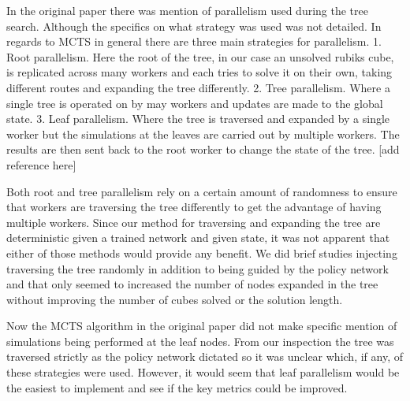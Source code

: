 \documentclass[10pt,twocolumn,letterpaper]{article}
\begin{document}
In the original paper there was mention of parallelism used during the tree search.  Although the specifics on what strategy was used was not detailed.  In regards to MCTS in general there are three main strategies for parallelism. 1. Root parallelism. Here the root of the tree, in our case an unsolved rubiks cube, is replicated across many workers and each tries to solve it on their own, taking different routes and expanding the tree differently.  2. Tree parallelism.  Where a single tree is operated on by may workers and updates are made to the global state.  3.  Leaf parallelism.  Where the tree is traversed and expanded by a single worker but the simulations at the leaves are carried out by multiple workers.  The results are then sent back to the root worker to change the state of the tree.   [add reference here]

Both root and tree parallelism rely on a certain amount of randomness to ensure that workers are traversing the tree differently to get the advantage of having multiple workers.  Since our method for traversing and expanding the tree are deterministic given a trained network and given state, it was not apparent that either of those methods would provide any benefit.  We did brief studies injecting traversing the tree randomly in addition to being guided by the policy network and that only seemed to increased the number of nodes expanded in the tree without improving the number of cubes solved or the solution length. 

Now the MCTS algorithm in the original paper did not make specific mention of simulations being performed at the leaf nodes.  From our inspection the tree was traversed strictly as the policy network dictated so it was unclear which, if any, of these strategies were used.  However, it would seem that leaf parallelism would be the easiest to implement and see if the key metrics could be improved. 
\end{document}
